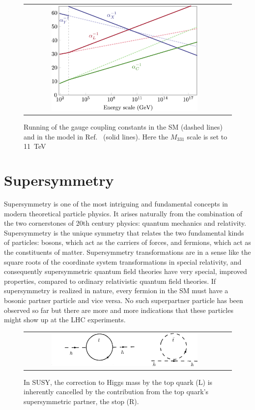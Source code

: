 \begin{figure}[tbh!]
	\centering
	\begin{tabular}{cc}
		\includegraphics[width=0.75\textwidth]{theory/pics/gauge_unification.png}
	\end{tabular}
	\caption{Running of the gauge coupling constants in the SM (dashed lines) and in the model in Ref.~\cite{PhysRevD.90.013005} (solid lines). Here the $M_{331}$ scale is set to 11~TeV}
	\label{fig:gauge_unification}
\end{figure}


\section{Supersymmetry}

Supersymmetry is one of the most intriguing and fundamental concepts in modern theoretical particle physics. It arises naturally from the combination of the two cornerstones of 20th century physics: quantum mechanics and relativity. Supersymmetry is the unique symmetry that relates the two fundamental kinds of particles: bosons, which act as the carriers of forces, and fermions, which act as the constituents of matter. Supersymmetry transformations are in a sense like the square roots of the coordinate system transformations in special relativity, and consequently supersymmetric quantum field theories have very special, improved properties, compared to ordinary relativistic quantum field theories. If supersymmetry is realized in nature, every fermion in the SM must have a bosonic partner particle and vice versa. No such superpartner particle has been observed so far but there are more and more indications that these particles might show up at the LHC experiments.


\begin{figure}[tbh!]
	\centering
	\begin{tabular}{cc}
		\includegraphics[width=0.75\textwidth]{theory/pics/higgs_loop.png}
	\end{tabular}
	\caption{In SUSY, the correction to Higgs mass by the top quark (L) is inherently cancelled by the contribution from the top quark's supersymmetric partner, the stop (R).}
	\label{fig:higgs_loop}
\end{figure}

